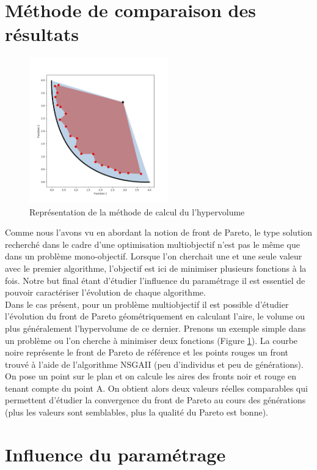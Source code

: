 \documentclass[12pt]{report}
\begin{document}
    \section{Méthode de comparaison des résultats}
      \begin{figure}
        \centering
        \includegraphics[width=6cm]{img/hypervolume.png}
        \caption{Représentation de la méthode de calcul du l'hypervolume}
        \label{hypervolume}
      \end{figure}
      Comme nous l'avons vu en abordant la notion de front de Pareto, le type solution recherché dans le cadre d'une optimisation multiobjectif n'est pas le même que dans un problème mono-objectif. Lorsque l'on cherchait une et une seule valeur avec le premier algorithme, l'objectif est ici de minimiser plusieurs fonctions à la fois. Notre but final étant d'étudier l'influence du paramétrage il est essentiel de pouvoir caractériser l'évolution de chaque algorithme. \\
      Dans le cas présent, pour un problème multiobjectif il est possible d'étudier l'évolution du front de Pareto géométriquement en calculant l'aire, le volume ou plus généralement l'hypervolume de ce dernier.
      Prenons un exemple simple dans un problème ou l'on cherche à minimiser deux fonctions (Figure \ref{hypervolume}). La courbe noire représente le front de Pareto de référence et les points rouges un front trouvé à l'aide de l'algorithme NSGAII (peu d'individus et peu de générations). On pose un point sur le plan et on calcule les aires des fronts noir et rouge en tenant compte du point A. On obtient alors deux valeurs réelles comparables qui permettent d'étudier la convergence du front de Pareto au cours des générations (plus les valeurs sont semblables, plus la qualité du Pareto est bonne).
    \section{Influence du paramétrage}
\end{document}
